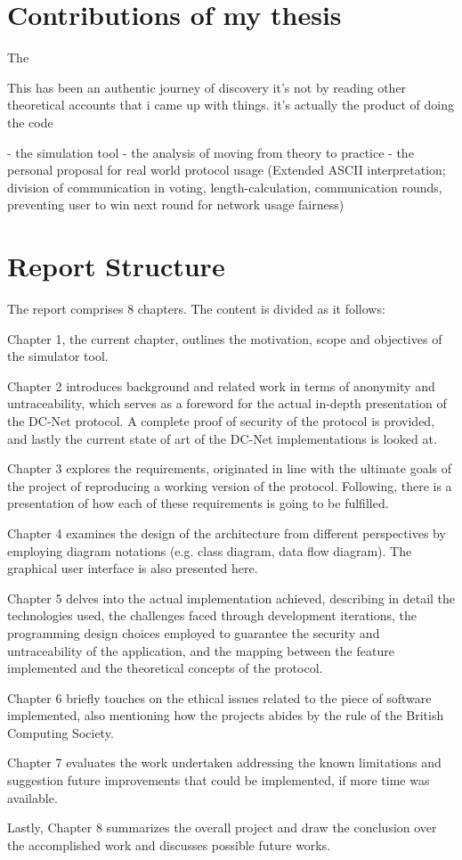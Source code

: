 \section{Contributions of my thesis}

The 


This has been an authentic journey of discovery it's not by reading other theoretical accounts that i came up with things. it's actually the product of doing the code 



- the simulation tool
- the analysis of moving from theory to practice
- the personal proposal for real world protocol usage (Extended ASCII interpretation; division of communication in voting, length-calculation, communication rounds, preventing user to win next round for network usage fairness)



\section{Report Structure}

The report comprises 8 chapters. The content is divided as it follows:

Chapter 1, the current chapter, outlines the motivation, scope and objectives of the simulator tool.

Chapter 2 introduces background and related work in terms of anonymity and untraceability, which serves as a foreword for the actual in-depth presentation of the DC-Net protocol. A complete proof of security of the protocol is provided, and lastly the current state of art of the DC-Net implementations is looked at.

Chapter 3 explores the requirements, originated in line with the ultimate goals of the project of reproducing a working version of the protocol. Following, there is a presentation of how each of these requirements is going to be fulfilled. 

Chapter 4 examines the design of the architecture from different perspectives by employing diagram notations (e.g. class diagram, data flow diagram). The graphical user interface is also presented here.

Chapter 5 delves into the actual implementation achieved, describing in detail the technologies used, the challenges faced through development iterations, the programming design choices employed to guarantee the security and untraceability of the application, and the mapping between the feature implemented and the theoretical concepts of the protocol.

Chapter 6 briefly touches on the ethical issues related to the piece of software implemented, also mentioning how the projects abides by the rule of the British Computing Society.

Chapter 7 evaluates the work undertaken addressing the known limitations and suggestion future improvements that could be implemented, if more time was available.

Lastly, Chapter 8 summarizes the overall project and draw the conclusion over the accomplished work and discusses possible future works.